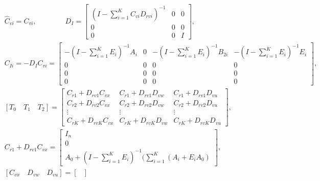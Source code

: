 \documentclass[twocolumn]{autart}    %
\begin{document}
\begin{figure*}[ht] %
    \flushleft
    \begin{equation}
        \begin{aligned}
            &\hat{C}_{vi} = C_{vi},    \quad \quad \quad \quad  D_{I} = 
                                            \begin{bmatrix}
                                                (I-\sum_{i=1}^{K}C_{vi}D_{rvi})^{-1} & 0 & 0 \\
                                                0 & 0 & 0 \\
                                                0 & 0 & I
                                            \end{bmatrix}  ,            \\
            &C_{Ii} = -D_{I}C_{vi} = \begin{bmatrix}
                -(I-\sum_{i=1}^{K}E_{i})^{-1}A_{i} & 0 & -(I-\sum_{i=1}^{K}E_{i})^{-1}B_{2i} & -(I-\sum_{i=1}^{K}E_{i})^{-1}E_{i} \\
                0 & 0 & 0 & 0\\
                0 & 0 & 0 & 0\\
                0 & 0 & 0 & 0
                \end{bmatrix}
                ,           \\   
            &[T_{0} \quad T_{1} \quad T_{2}] = \begin{bmatrix}
                C_{r1}+D_{rv1}C_{vx} & C_{r1}+D_{rv1}D_{vw}  & C_{r1}+D_{rv1}D_{vu}  \\
                C_{r2}+D_{rv2}C_{vx} & C_{r2}+D_{rv2}D_{vw}  & C_{r2}+D_{rv2}D_{vu}  \\
                \vdots & \vdots & \vdots \\
                C_{rK}+D_{rvK}C_{vx} & C_{rK}+D_{rvK}D_{vw}  & C_{rK}+D_{rvK}D_{vu}   
            \end{bmatrix},\\
            &C_{r1}+D_{rv1}C_{vx} = 
            \begin{bmatrix}
            I_{n}    \\
            0        \\
            A_{0}+(I-\sum_{i=1}^{K}E_{i})^{-1}(\sum_{i=1}^{K}(A_{i}+E_{i}A_{0})
            \end{bmatrix},\\
            &[C_{vx} \quad D_{vw} \quad D_{vu}] = \begin{bmatrix}

\end{bmatrix}
\end{aligned}
\end{equation}
\end{figure*}
\end{document}
